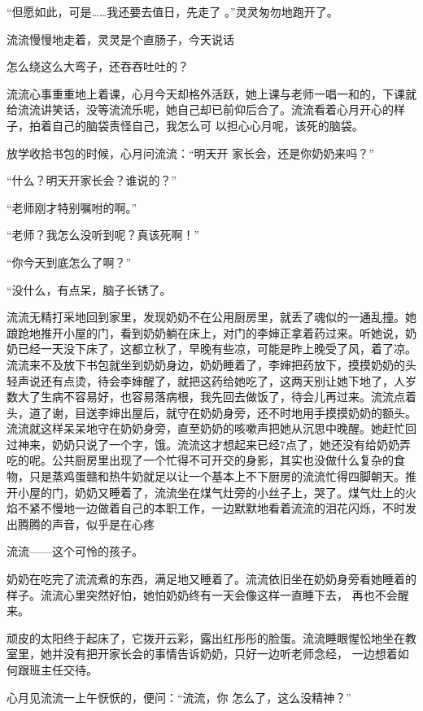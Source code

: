 \documentclass{article}
\begin{document}
“但愿如此，可是……我还要去值日，先走了
。”灵灵匆勿地跑开了。 

流流慢慢地走着，灵灵是个直肠子，今天说话
\newpage

怎么绕这么大弯子，还吞吞吐吐的？ 

流流心事重重地上着课，心月今天却格外活跃，她上课与老师一唱一和的，下课就给流流讲笑话，没等流流乐呢，她自己却已前仰后合了。流流看着心月开心的样子，拍着自己的脑袋责怪自己，我怎么可
以担心心月呢，该死的脑袋。 

放学收拾书包的时候，心月问流流：“明天开
家长会，还是你奶奶来吗？” 


“什么？明天开家长会？谁说的？” 


“老师刚才特别嘱咐的啊。” 


“老师？我怎么没听到呢？真该死啊！” 


“你今天到底怎么了啊？” 


“没什么，有点呆，脑子长锈了。 

\newpage

流流无精打采地回到家里，发现奶奶不在公用厨房里，就丢了魂似的一通乱撞。她踉跄地推开小屋的门，看到奶奶躺在床上，对门的李婶正拿着药过来。听她说，奶奶已经一天没下床了，这都立秋了，早晚有些凉，可能是昨上晚受了风，着了凉。流流来不及放下书包就坐到奶奶身边，奶奶睡着了，李婶把药放下，摸摸奶奶的头轻声说还有点烫，待会李婶醒了，就把这药给她吃了，这两天别让她下地了，人岁数大了生病不容易好，也容易落病根，我先回去做饭了，待会儿再过来。流流点着头，道了谢，目送李婶出屋后，就守在奶奶身旁，还不时地用手摸摸奶奶的额头。流流就这样呆呆地守在奶奶身旁，直至奶奶的咳嗽声把她从沉思中晚醒。她赶忙回过神来，奶奶只说了一个字，饿。流流这才想起来已经7点了，她还没有给奶奶弄吃的呢。公共厨房里出现了一个忙得不可开交的身影，其实也没做什么复杂的食物，只是蒸鸡蛋赣和热牛奶就足以让一个基本上不下厨房的流流忙得四脚朝天。推开小屋的门，奶奶又睡着了，流流坐在煤气灶旁的小丝子上，哭了。煤气灶上的火焰不紧不慢地一边做着自己的本职工作，一边默默地看着流流的泪花闪烁，不时发出腾腾的声音，似乎是在心疼
\newpage

流流——这个可怜的孩子。 

奶奶在吃完了流流煮的东西，满足地又睡着了。流流依旧坐在奶奶身旁看她睡着的样子。流流心里突然好怕，她怕奶奶终有一天会像这样一直睡下去，
再也不会醒来。 

顽皮的太阳终于起床了，它拨开云彩，露出红彤彤的脸蛋。流流睡眼惺忪地坐在教室里，她并没有把开家长会的事情告诉奶奶，只好一边听老师念经，
一边想着如何跟班主任交待。 

心月见流流一上午恹恹的，便问：“流流，你
怎么了，这么没精神？” 
\end{document}
